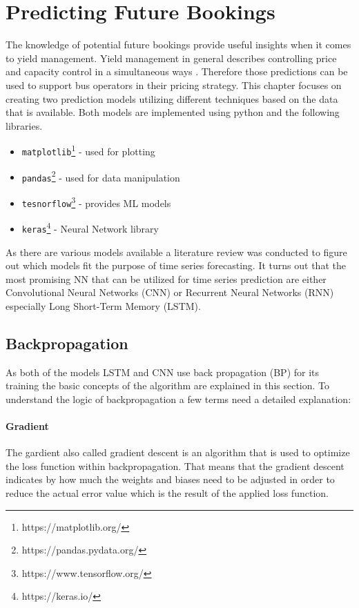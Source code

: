 %
%
% 
% 
% 

\chapter{Predicting Future Bookings}
\label{chap:predict}
The knowledge of potential future bookings provide useful insights when it comes to yield management. Yield management in general describes controlling price and capacity control in a simultaneous ways \cite{yield_m}. Therefore those predictions can be used to support bus operators in their pricing strategy.  This chapter focuses on creating two prediction models utilizing different techniques based on the data that is available. 
Both models are implemented using python and the following libraries. 
\begin{itemize}
\item  \verb|matplotlib|\footnote{https://matplotlib.org/} - used for plotting
\item \verb|pandas|\footnote{https://pandas.pydata.org/} - used for data manipulation 
\item \verb|tesnorflow|\footnote{https://www.tensorflow.org/} - provides ML models
\item \verb|keras|\footnote{https://keras.io/} - Neural Network library
\end{itemize}

As there are various models available a literature review was conducted to figure out which models fit the purpose of time series forecasting. It turns out that the most promising NN that can be utilized for time series prediction are either Convolutional Neural Networks (CNN) or Recurrent Neural Networks (RNN) especially Long Short-Term Memory (LSTM)\cite{nn_1}\cite{nn_2}\cite{lstm_1}\cite{lstm_2}.

\section{Backpropagation}

As both of the models LSTM and CNN use back propagation (BP) for its training the basic concepts of the algorithm are explained in this section. To understand the logic of backpropagation a few terms need a detailed explanation: 
\subsubsection{Gradient}
The gardient also called gradient descent is an algorithm that is used to optimize the loss function within backpropagation. That means that the gradient descent indicates by how much the weights and biases need to be adjusted in order to reduce the actual error value which is the result of the applied loss function. \cite{bp_basic}
